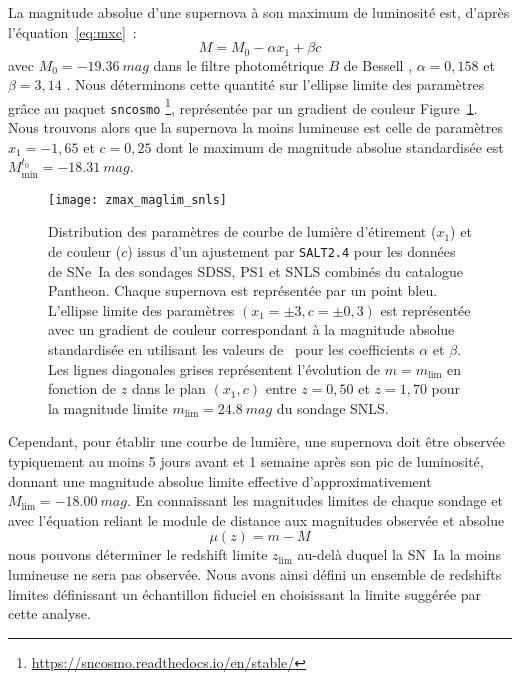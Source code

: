 \documentclass[../main/main.tex]{subfiles}
\begin{document}
La magnitude absolue d'une supernova à son maximum de luminosité est, d'après
l'équation~\ref{eq:mxc}~:
\begin{equation*}
    M = M_0 -\alpha x_1 + \beta c
\end{equation*}
avec $M_0 = \SI{-19,36}{mag}$ dans le filtre photométrique $B$ de Bessell
\citep{kessler2009a, scolnic2014}, $\alpha=0,158$ et $\beta=3,14$
\citep[Table 7,][]{scolnic2018}. Nous déterminons cette quantité sur l'ellipse
limite des paramètres grâce au paquet \texttt{sncosmo}
\footnote{\href{https://sncosmo.readthedocs.io/en/stable/}
{https://sncosmo.readthedocs.io/en/stable/}}, représentée par un gradient de
couleur Figure~\ref{fig:maglim}. Nous trouvons alors que la supernova la moins
lumineuse est celle de paramètres $x_1 = -1,65$ et $c = 0,25$ dont le maximum de
magnitude absolue standardisée est $M_{\min}^{t_0}=\SI{-18,31}{mag}$.

\begin{figure}
    \centering
    \texttt{[image: zmax\_maglim\_snls]}
    \caption[Distribution et limite des paramètres de courbe de lumière
    d'étirement ($x_1$) et de couleur ($c$) des sondages SDSS, PS1 et SNLS
    combinés du catalogue Pantheon]{Distribution des paramètres de courbe de
        lumière d'étirement ($x_1$) et de couleur ($c$) issus d'un ajustement
        par \texttt{SALT2.4} pour les données de SNe~Ia des sondages SDSS, PS1 et
        SNLS combinés du catalogue Pantheon. Chaque supernova est représentée par un
        point bleu. L'ellipse limite des paramètres $(x_1=\pm3, c=\pm0,3)$ est
        représentée avec un gradient de couleur correspondant à la magnitude
        absolue standardisée en utilisant les valeurs de~\cite{scolnic2018} pour
        les coefficients $\alpha$ et $\beta$. Les lignes diagonales grises
        représentent l'évolution de $m = m_{\lim}$ en fonction de $z$ dans le
        plan $(x_1,c)$ entre $z=0,50$ et $z=1,70$ pour la magnitude limite
    $m_{\lim}=\SI{24,8}{mag}$ du sondage SNLS.}
    \label{fig:maglim}
\end{figure}

Cependant, pour établir une courbe de lumière, une supernova doit être observée
typiquement au moins 5 jours avant et 1 semaine après son pic de luminosité,
donnant une magnitude absolue limite effective d'approximativement $M_{\lim} =
\SI{-18,00}{mag}$. En connaissant les magnitudes limites de chaque sondage et
avec l'équation reliant le module de distance aux magnitudes observée et absolue
\begin{equation}\label{eq:distmod}
    \mu(z) = m - M
\end{equation}
nous pouvons déterminer le redshift limite $z_{\lim}$ au-delà duquel la SN~Ia la
moins lumineuse ne sera pas observée. Nous avons ainsi défini un ensemble de
redshifts limites définissant un échantillon fiduciel en choisissant la limite
suggérée par cette analyse.
\end{document}
